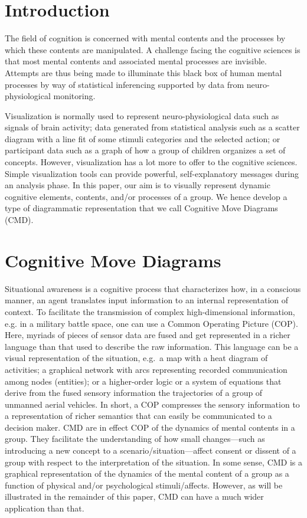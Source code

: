 \documentclass[conference]{IEEEtran}
\begin{document}
\section{Introduction}\label{sec:Introduction}
The field of cognition is concerned with mental contents and the processes by which these contents
are manipulated. A challenge facing the cognitive sciences is that most mental contents and
associated mental processes are invisible. Attempts are thus being made to illuminate this black
box of human mental processes by way of statistical inferencing supported by data from
neuro-physiological monitoring.

Visualization is normally used to represent neuro-phy\-si\-o\-lo\-gi\-cal data such as signals of
brain activity; data generated from statistical analysis such as a scatter diagram with a line fit
of some stimuli categories and the selected action; or participant data such as a graph of how a
group of children organizes a set of concepts. However, visualization has a lot more to offer to
the cognitive sciences. Simple visualization tools can provide powerful, self-explanatory messages
during an analysis phase. In this paper, our aim is to visually represent dynamic cognitive
elements, contents, and/or processes of a group. We hence develop a type of diagrammatic
representation that we call Cognitive Move Diagrams (CMD).

\section{Cognitive Move Diagrams}\label{sec:CMD}
Situational awareness is a cognitive process that characterizes how, in a conscious manner, an
agent translates input information to an internal representation of context. To facilitate the
transmission of complex high-dimensional information, e.g. in a military battle space, one can use
a Common Operating Picture (COP). Here, myriads of pieces of sensor data are fused and get
represented in a richer language than that used to describe the raw information. This language can
be a visual representation of the situation, e.g.\ a map with a heat diagram of activities; a
graphical network with arcs representing recorded communication among nodes (entities); or a
higher-order logic or a system of equations that derive from the fused sensory information the
trajectories of a group of unmanned aerial vehicles. In short, a COP compresses the sensory
information to a representation of richer semantics that can easily be communicated to a decision
maker. CMD are in effect COP of the dynamics of mental contents in a group. They facilitate the
understanding of how small changes---such as introducing a new concept to a
scenario/situation---affect consent or dissent of a group with respect to the interpretation of the
situation. In some sense, CMD is a graphical representation of the dynamics of the mental content
of a group as a function of physical and/or psychological stimuli/affects. However, as will be
illustrated in the remainder of this paper, CMD can have a much wider application than that.
\end{document}
